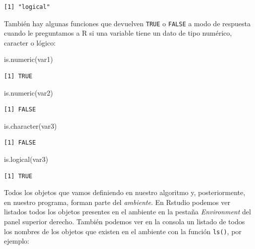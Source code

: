 \documentclass[
]{book}
\newenvironment{Shaded}{\begin{snugshade}}{\end{snugshade}}
\newcommand{\FunctionTok}[1]{\textcolor[rgb]{0.00,0.00,0.00}{#1}}
\newcommand{\NormalTok}[1]{#1}
\begin{document}
\begin{verbatim}
[1] "logical"
\end{verbatim}

También hay algunas funciones que devuelven \texttt{TRUE} o \texttt{FALSE} a modo de respuesta cuando le preguntamos a R si una variable tiene un dato de tipo numérico, caracter o lógico:

\begin{Shaded}
\begin{Highlighting}[]
\FunctionTok{is.numeric}\NormalTok{(var1)}
\end{Highlighting}
\end{Shaded}

\begin{verbatim}
[1] TRUE
\end{verbatim}

\begin{Shaded}
\begin{Highlighting}[]
\FunctionTok{is.numeric}\NormalTok{(var2)}
\end{Highlighting}
\end{Shaded}

\begin{verbatim}
[1] FALSE
\end{verbatim}

\begin{Shaded}
\begin{Highlighting}[]
\FunctionTok{is.character}\NormalTok{(var3)}
\end{Highlighting}
\end{Shaded}

\begin{verbatim}
[1] FALSE
\end{verbatim}

\begin{Shaded}
\begin{Highlighting}[]
\FunctionTok{is.logical}\NormalTok{(var3)}
\end{Highlighting}
\end{Shaded}

\begin{verbatim}
[1] TRUE
\end{verbatim}

Todos los objetos que vamos definiendo en nuestro algoritmo y, posteriormente, en nuestro programa, forman parte del \emph{ambiente}. En Rstudio podemos ver listados todos los objetos presentes en el ambiente en la pestaña \emph{Environment} del panel superior derecho. También podemos ver en la consola un listado de todos los nombres de los objetos que existen en el ambiente con la función \texttt{ls()}, por ejemplo:
\end{document}
